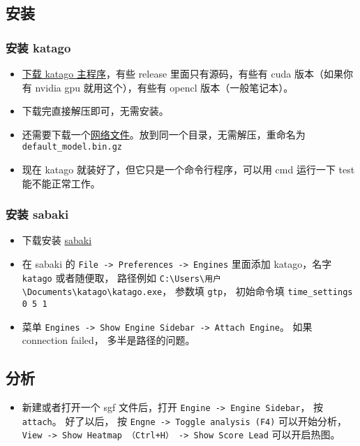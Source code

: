 
\begin{issues}
\issueDraft
\end{issues}

\subsection{安装}
\subsubsection{安装 katago}
\begin{itemize}
\item \href{https://github.com/lightvector/KataGo/releases}{下载 katago 主程序}，有些 release 里面只有源码，有些有 cuda 版本（如果你有 nvidia gpu 就用这个），有些有 opencl 版本（一般笔记本）。
\item 下载完直接解压即可，无需安装。
\item 还需要下载一个\href{https://katagotraining.org/networks/}{网络文件}。放到同一个目录，无需解压，重命名为 \verb|default_model.bin.gz|
\item 现在 katago 就装好了，但它只是一个命令行程序，可以用 cmd 运行一下 test 能不能正常工作。
\end{itemize}

\subsubsection{安装 sabaki}
\begin{itemize}
\item 下载安装 \href{https://sabaki.yichuanshen.de/}{sabaki}
\item 在 sabaki 的 \verb|File -> Preferences -> Engines| 里面添加 katago，名字 \verb|katago| 或者随便取， 路径例如 \verb|C:\Users\用户\Documents\katago\katago.exe|， 参数填 \verb|gtp|， 初始命令填 \verb|time_settings 0 5 1|
\item 菜单 \verb|Engines -> Show Engine Sidebar -> Attach Engine|。 如果 connection failed， 多半是路径的问题。
\end{itemize}

\subsection{分析}
\begin{itemize}
\item 新建或者打开一个 sgf 文件后，打开 \verb|Engine -> Engine Sidebar|， 按 \verb|attach|。 好了以后， 按 \verb|Engne -> Toggle analysis (F4)| 可以开始分析， \verb|View -> Show Heatmap （Ctrl+H） -> Show Score Lead| 可以开启热图。
\end{itemize}
